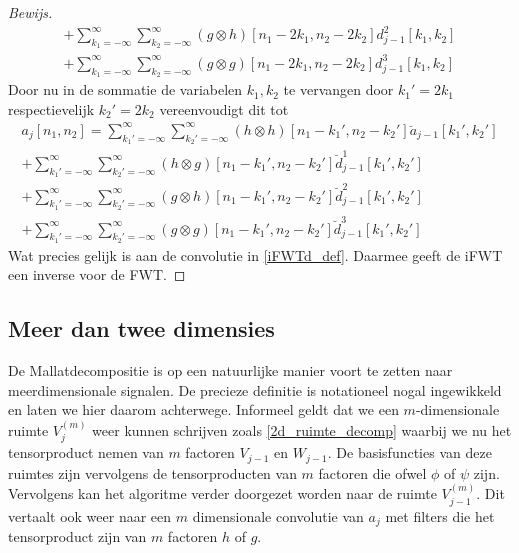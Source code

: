 \begin{proof}[Bewijs]
\begin{equation*}
\begin{split}
      + \sum_{k_1=-\infty}^\infty\sum_{k_2=-\infty}^\infty 
      (g\otimes h)[n_1-2k_1,n_2-2k_2] d^2_{j-1}[k_1,k_2] \\
      + \sum_{k_1=-\infty}^\infty\sum_{k_2=-\infty}^\infty 
      (g\otimes g)[n_1-2k_1,n_2-2k_2] d^3_{j-1}[k_1,k_2]
      \end{split}
  \end{equation*}
  Door nu in de sommatie de variabelen $k_1,k_2$ te vervangen door $k_1'=2k_1$ respectievelijk $k_2'=2k_2$ 
  vereenvoudigt dit tot
  \begin{equation*}
    \begin{split}
      a_{j}[n_1,n_2] = 
      \sum_{k_1'=-\infty}^\infty\sum_{k_2'=-\infty}^\infty 
      (h\otimes h)[n_1-k_1',n_2-k_2'] \breve a_{j-1}[k_1',k_2'] \\
      + \sum_{k_1'=-\infty}^\infty\sum_{k_2'=-\infty}^\infty 
      (h\otimes g)[n_1-k_1',n_2-k_2'] \breve d^1_{j-1}[k_1',k_2'] \\
      + \sum_{k_1'=-\infty}^\infty\sum_{k_2'=-\infty}^\infty 
      (g\otimes h)[n_1-k_1',n_2-k_2'] \breve d^2_{j-1}[k_1',k_2'] \\
      + \sum_{k_1'=-\infty}^\infty\sum_{k_2'=-\infty}^\infty 
      (g\otimes g)[n_1-k_1',n_2-k_2'] \breve d^3_{j-1}[k_1',k_2']
      \end{split}
  \end{equation*}
  Wat precies gelijk is aan de convolutie in \ref{iFWTd_def}. Daarmee geeft de iFWT een inverse voor de FWT.
\end{proof}

\subsection{Meer dan twee dimensies}
\label{mallat_md}
De Mallatdecompositie is op een natuurlijke manier voort te zetten naar meerdimensionale signalen.
De precieze definitie is notationeel nogal ingewikkeld en laten we hier daarom achterwege.
Informeel geldt dat we een $m$-dimensionale ruimte $V_{j}^{(m)}$ 
weer kunnen schrijven zoals \ref{2d_ruimte_decomp}
waarbij we nu het tensorproduct nemen van $m$ factoren $V_{j-1}$ en $W_{j-1}$.
De basisfuncties van deze ruimtes zijn vervolgens de tensorproducten van $m$ 
factoren die ofwel $\phi$ of $\psi$ zijn.
Vervolgens kan het algoritme verder doorgezet worden naar de ruimte $V_{j-1}^{(m)}$.
Dit vertaalt ook weer naar een $m$ dimensionale convolutie van $a_j$ met 
filters die het tensorproduct zijn van $m$ factoren $h$ of $g$.


